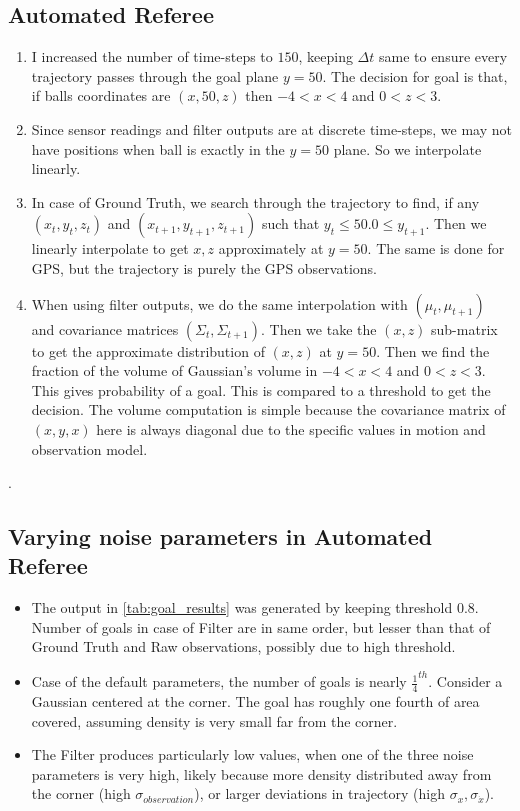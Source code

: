 \subsection{Automated Referee}
\begin{enumerate}
\item I increased the number of time-steps to $150$, keeping $\Delta t$ same to ensure every trajectory passes through the goal plane $y = 50$. The decision for goal is that, if balls coordinates are $(x, 50, z)$ then $-4 < x < 4$ and $0 < z < 3$.

\item Since sensor readings and filter outputs are at discrete time-steps, we may not have positions when ball is exactly in the $y = 50$ plane. So we interpolate linearly.

\item In case of Ground Truth, we search through the trajectory to find, if any $(x_t, y_t, z_t)$ and $(x_{t + 1}, y_{t + 1}, z_{t + 1})$ such that $y_t \leq 50.0 \leq y_{t + 1}$. Then we linearly interpolate to get $x, z$ approximately at $y = 50$.  The same is done for GPS, but the trajectory is purely the GPS observations.

\item When using filter outputs, we do the same interpolation with $(\mu_t, \mu_{t + 1})$ and covariance matrices $(\Sigma_t, \Sigma_{t  + 1})$. Then we take the $(x, z)$ sub-matrix to get the approximate distribution of $(x, z)$ at $y = 50$. Then we find the fraction of the volume of Gaussian's volume in $-4 < x < 4$ and $0 < z < 3$. This gives probability of a goal. This is compared to a threshold to get the decision. The volume computation is simple because the covariance matrix of $(x, y, x)$ here is always diagonal due to the specific values in motion and observation model.
\end{enumerate}.

\subsection{Varying noise parameters in Automated Referee}
\begin{itemize}
    \item The output in \autoref{tab:goal_results} was generated by keeping threshold $0.8$. Number of goals in case of Filter are in same order, but lesser than that of Ground Truth and Raw observations, possibly due to high threshold. 
    \item Case of the default parameters, the number of goals is nearly $\frac{1}{4}^{th}$. Consider a Gaussian centered at the corner. The goal has roughly one fourth of area covered, assuming density is very small far from the corner. 

    \item The Filter produces particularly low values, when     one of the three noise parameters is very high, likely because more density distributed away from the corner (high $\sigma_{observation}$), or larger deviations in trajectory (high $\sigma_x, \sigma_{\dot{x}}$).
\end{itemize}

    

